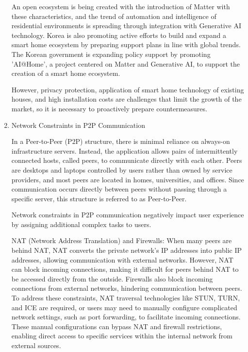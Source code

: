 \documentclass[conference]{IEEEtran}
\begin{document}
\begin{enumerate}[itemsep=2ex, parsep=1ex]
	      An open ecosystem is being created with the introduction of Matter with these characteristics, and the trend of automation and intelligence of residential environments is spreading through integration with Generative AI technology. Korea is also promoting active efforts to build and expand a smart home ecosystem by preparing support plans in line with global trends. The Korean government is expanding policy support by promoting 'AI@Home', a project centered on Matter and Generative AI, to support the creation of a smart home ecosystem.
	      	      	          
	      However, privacy protection, application of smart home technology of existing houses, and high installation costs are challenges that limit the growth of the market, so it is necessary to proactively prepare countermeasures.
	      	      	          
	\item Network Constraints in P2P Communication
	      	      	          
	      In a Peer-to-Peer (P2P) structure, there is minimal reliance on always-on infrastructure servers. Instead, the application allows pairs of intermittently connected hosts, called peers, to communicate directly with each other. Peers are desktops and laptops controlled by users rather than owned by service providers, and most peers are located in homes, universities, and offices. Since communication occurs directly between peers without passing through a specific server, this structure is referred to as Peer-to-Peer. 
	      	      	      
	      Network constraints in P2P communication negatively impact user experience by assigning additional complex tasks to users.
	      	      	          
	      NAT (Network Address Translation) and Firewalls: 
	      When many peers are behind NAT, NAT converts the private network's IP addresses into public IP addresses, allowing communication with external networks. However, NAT can block incoming connections, making it difficult for peers behind NAT to be accessed directly from the outside.
	      Firewalls also block incoming connections from external networks, hindering communication between peers.
	      To address these constraints, NAT traversal technologies like STUN, TURN, and ICE are required, or users may need to manually configure complicated network settings, such as port forwarding, to facilitate incoming connections. These manual configurations can bypass NAT and firewall restrictions, enabling direct access to specific services within the internal network from external sources.
	      	      	          

\end{enumerate}
\end{document}
